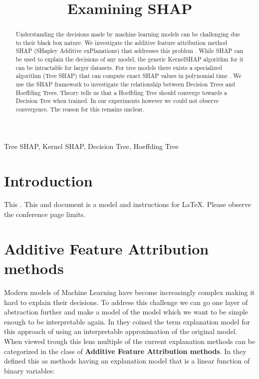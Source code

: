 \documentclass[conference]{IEEEtran}
\begin{document}
\title{Examining SHAP}

\author{
}

\maketitle

\begin{abstract}
Understanding the decisions made by machine learning models can be challenging due to their black box nature.
We investigate the additive feature attribution method SHAP (SHapley Additive exPlanations) that addresses this problem \cite{b2}. 
While SHAP can be used to explain the decisions of any model, the generic KernelSHAP algorithm for it can be intractable for larger datasets. 
For tree models there exists a specialized algorithm (Tree SHAP) that can compute exact SHAP values in polynomial time \cite{b1}. 
We use the SHAP framework to investigate the relationship between Decision Trees and Hoeffding Trees\cite{b3}. 
Theory tells us that a Hoeffding Tree should converge towards a Decision Tree when trained. 
In our experiments however we could not observe convergence. 
The reason for this remains unclear.
\end{abstract}

\begin{IEEEkeywords}
Tree SHAP, Kernel SHAP, Decision Tree, Hoeffding Tree
\end{IEEEkeywords}

\section{Introduction}
This . This  and \cite{b3} document is a model and instructions for \LaTeX.
Please observe the conference page limits. 

\section{Additive Feature Attribution methods}
Modern models of Machine Learning have become increasingly complex making it hard to explain their decisions.
To address this challenge we can go one layer of abstraction further and make a model of the model which we want to be simple enough to be interpretable again.
In \cite{b2} they coined the term explanation model for this approach of using an interpretable approximation of the original model.\\
When viewed trough this lens multiple of the current explanation methods can be categorized in the class of  \textbf{Additive Feature Attribution methods}. In \cite{b2} they defined this as methods having an explanation model that is a linear function of binary variables:\\
\end{document}
